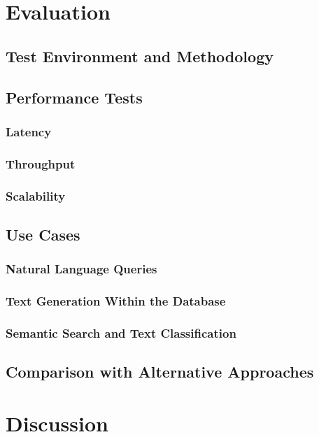 \documentclass{article}
\begin{document}
\section{Evaluation}

\subsection{Test Environment and Methodology}

\subsection{Performance Tests}
\subsubsection{Latency}
\subsubsection{Throughput}
\subsubsection{Scalability}

\subsection{Use Cases}
\subsubsection{Natural Language Queries}
\subsubsection{Text Generation Within the Database}
\subsubsection{Semantic Search and Text Classification}

\subsection{Comparison with Alternative Approaches}

\newpage

\section{Discussion}
\end{document}
